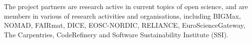 The project partners are research active in current topics of open science, and
are members in various of research activities and organisations, including
BIGMax, NOMAD, FAIRmat, DICE, EOSC-NORDIC, RELIANCE, EuroScienceGateway, The Carpentries, 
CodeRefinery and Software Sustainability Institute (SSI).


% 
